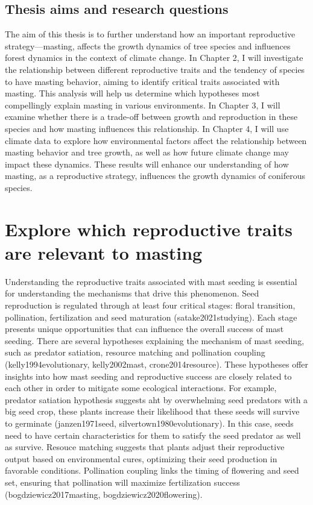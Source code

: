 \documentclass[11pt,letter]{article}
\begin{document}
\subsection{Thesis aims and research questions}
The aim of this thesis is to further understand how an important reproductive strategy—masting, affects the growth dynamics of tree species and influences forest dynamics in the context of climate change. In Chapter 2, I will investigate the relationship between different reproductive traits and the tendency of species to have masting behavior, aiming to identify critical traits associated with masting. This analysis will help us determine which hypotheses most compellingly explain masting in various environments. In Chapter 3, I will examine whether there is a trade-off between growth and reproduction in these species and how masting influences this relationship. In Chapter 4, I will use climate data to explore how environmental factors affect the relationship between masting behavior and tree growth, as well as how future climate change may impact these dynamics. These results will enhance our understanding of how masting, as a reproductive strategy, influences the growth dynamics of coniferous species.


\section{Explore which reproductive traits are relevant to masting}
Understanding the reproductive traits associated with mast seeding is essential for understanding the mechanisms that drive this phenomenon. Seed reproduction is regulated through at least four critical stages: floral transition, pollination, fertilization and seed maturation (satake2021studying). Each stage presents unique opportunities that can influence the overall success of mast seeding. There are several hypotheses explaining the mechanism of mast seeding, such as predator satiation, resource matching and pollination coupling (kelly1994evolutionary, kelly2002mast, crone2014resource). These hypotheses offer insights into how mast seeding and reproductive success are closely related to each other in order to mitigate some ecological interactions. For example, predator satiation hypothesis suggests aht by overwhelming seed predators with a big seed crop, these plants increase their likelihood that these seeds will survive to germinate (janzen1971seed, silvertown1980evolutionary). In this case, seeds need to have certain characteristics for them to satisfy the seed predator as well as survive. Resouce matching suggests that plants adjust their reproductive output based on environmental cures, optimizing their seed production in favorable conditions. Pollination coupling links the timing of flowering and seed set, ensuring that pollination will maximize fertilization success (bogdziewicz2017masting, bogdziewicz2020flowering). 
\end{document}
